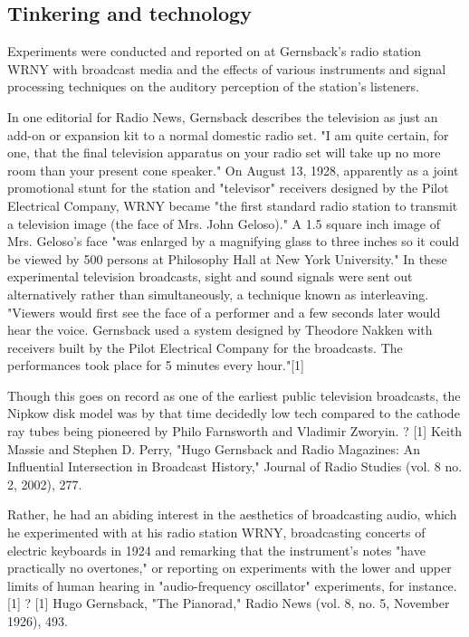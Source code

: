 \documentclass{article}
\begin{document}
\subsection{Tinkering and technology}

Experiments were conducted and reported on at Gernsback's radio station WRNY with broadcast media and the effects of various instruments and signal processing techniques on the auditory perception of the station's listeners.  

In one editorial for Radio News, Gernsback describes the television as just an add-on or expansion kit to a normal domestic radio set.  "I am quite certain, for one, that the final television apparatus on your radio set will take up no more room than your present cone speaker."  On August 13, 1928, apparently as a joint promotional stunt for the station and "televisor" receivers designed by the Pilot Electrical Company, WRNY became "the first standard radio station to transmit a television image (the face of Mrs. John Geloso)."  A 1.5 square inch image of Mrs. Geloso's face "was enlarged by a magnifying glass to three inches so it could be viewed by 500 persons at Philosophy Hall at New York University."  In these experimental television broadcasts, sight and sound signals were sent out alternatively rather than simultaneously, a technique known as interleaving.  "Viewers would first see the face of a performer and a few seconds later would hear the voice.  Gernsback used a system designed by Theodore Nakken with receivers built by the Pilot Electrical Company for the broadcasts.  The performances took place for 5 minutes every hour."[1]  

Though this goes on record as one of the earliest public television broadcasts, the Nipkow disk model was by that time decidedly low tech compared to the cathode ray tubes being pioneered by Philo Farnsworth and Vladimir Zworyin.
?
[1] Keith Massie and Stephen D. Perry, "Hugo Gernsback and Radio Magazines: An Influential Intersection in Broadcast History," Journal of Radio Studies (vol. 8 no. 2, 2002), 277.

Rather, he had an abiding interest in the aesthetics of broadcasting audio, which he experimented with at his radio station WRNY, broadcasting concerts of electric keyboards in 1924 and remarking that the instrument's notes "have practically no overtones," or reporting on experiments with the lower and upper limits of human hearing in "audio-frequency oscillator" experiments, for instance.[1]
?
[1] Hugo Gernsback, "The Pianorad," Radio News (vol. 8, no. 5, November 1926), 493.
\end{document}
